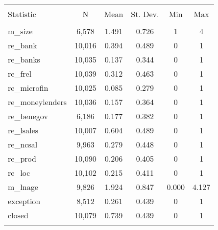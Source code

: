
\begin{table}[!htbp] \centering 
  \caption{} 
  \label{} 
\begin{tabular}{@{\extracolsep{5pt}}lccccc} 
\\[-1.8ex]\hline 
\hline \\[-1.8ex] 
Statistic & \multicolumn{1}{c}{N} & \multicolumn{1}{c}{Mean} & \multicolumn{1}{c}{St. Dev.} & \multicolumn{1}{c}{Min} & \multicolumn{1}{c}{Max} \\ 
\hline \\[-1.8ex] 
m\_size & 6,578 & 1.491 & 0.726 & 1 & 4 \\ 
re\_bank & 10,016 & 0.394 & 0.489 & 0 & 1 \\ 
re\_banks & 10,035 & 0.137 & 0.344 & 0 & 1 \\ 
re\_frel & 10,039 & 0.312 & 0.463 & 0 & 1 \\ 
re\_microfin & 10,025 & 0.085 & 0.279 & 0 & 1 \\ 
re\_moneylenders & 10,036 & 0.157 & 0.364 & 0 & 1 \\ 
re\_benegov & 6,186 & 0.177 & 0.382 & 0 & 1 \\ 
re\_lsales & 10,007 & 0.604 & 0.489 & 0 & 1 \\ 
re\_ncsal & 9,963 & 0.279 & 0.448 & 0 & 1 \\ 
re\_prod & 10,090 & 0.206 & 0.405 & 0 & 1 \\ 
re\_loc & 10,102 & 0.215 & 0.411 & 0 & 1 \\ 
m\_lnage & 9,826 & 1.924 & 0.847 & 0.000 & 4.127 \\ 
exception & 8,512 & 0.261 & 0.439 & 0 & 1 \\ 
closed & 10,079 & 0.739 & 0.439 & 0 & 1 \\ 
\hline \\[-1.8ex] 
\end{tabular} 
\end{table} 
